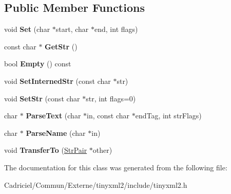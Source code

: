 \subsection*{Public Member Functions}
\begin{DoxyCompactItemize}
\item 
void {\bfseries Set} (char $\ast$start, char $\ast$end, int flags)\hypertarget{classtinyxml2_1_1_str_pair_a4f05549373394266a1eecba26813c166}{}\label{classtinyxml2_1_1_str_pair_a4f05549373394266a1eecba26813c166}

\item 
const char $\ast$ {\bfseries Get\+Str} ()\hypertarget{classtinyxml2_1_1_str_pair_a27290a8fec20c0a6ccf9d8362f5c3b1d}{}\label{classtinyxml2_1_1_str_pair_a27290a8fec20c0a6ccf9d8362f5c3b1d}

\item 
bool {\bfseries Empty} () const \hypertarget{classtinyxml2_1_1_str_pair_affa1043e73a18f05d5d2faec055725a7}{}\label{classtinyxml2_1_1_str_pair_affa1043e73a18f05d5d2faec055725a7}

\item 
void {\bfseries Set\+Interned\+Str} (const char $\ast$str)\hypertarget{classtinyxml2_1_1_str_pair_a2baf6230e18333e02ab65d0897ee3941}{}\label{classtinyxml2_1_1_str_pair_a2baf6230e18333e02ab65d0897ee3941}

\item 
void {\bfseries Set\+Str} (const char $\ast$str, int flags=0)\hypertarget{classtinyxml2_1_1_str_pair_a1f82ec6b5bee35ee7466d8565e43b1de}{}\label{classtinyxml2_1_1_str_pair_a1f82ec6b5bee35ee7466d8565e43b1de}

\item 
char $\ast$ {\bfseries Parse\+Text} (char $\ast$in, const char $\ast$end\+Tag, int str\+Flags)\hypertarget{classtinyxml2_1_1_str_pair_a7ff60a4aaea3ad696e940ecd31806a29}{}\label{classtinyxml2_1_1_str_pair_a7ff60a4aaea3ad696e940ecd31806a29}

\item 
char $\ast$ {\bfseries Parse\+Name} (char $\ast$in)\hypertarget{classtinyxml2_1_1_str_pair_a8452c0c7f140d4d613134e952ce54f14}{}\label{classtinyxml2_1_1_str_pair_a8452c0c7f140d4d613134e952ce54f14}

\item 
void {\bfseries Transfer\+To} (\hyperlink{classtinyxml2_1_1_str_pair}{Str\+Pair} $\ast$other)\hypertarget{classtinyxml2_1_1_str_pair_a35f795b1557fe5fdcbd93d3cc5d6b939}{}\label{classtinyxml2_1_1_str_pair_a35f795b1557fe5fdcbd93d3cc5d6b939}

\end{DoxyCompactItemize}


The documentation for this class was generated from the following file\+:\begin{DoxyCompactItemize}
\item 
Cadriciel/\+Commun/\+Externe/tinyxml2/include/tinyxml2.\+h\end{DoxyCompactItemize}
